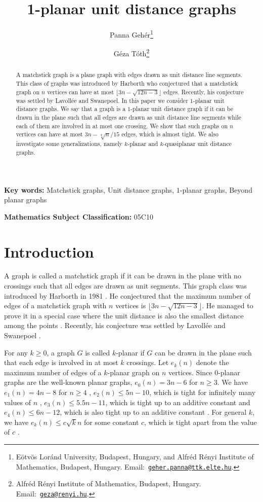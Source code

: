 \documentclass[a4paper,10pt]{article}
\title{1-planar unit distance graphs}
\author{
Panna Geh\'er\thanks{E\"otv\"os Lor\'and University, Budapest, Hungary, and Alfr\'ed R\'enyi Institute of Mathematics, Budapest, Hungary. \newline Email:~\href{mailto:geher.panna@ttk.elte.hu}{\tt geher.panna@ttk.elte.hu}.}
\and
G\'eza T\'oth\thanks{Alfr\'ed R\'enyi Institute of Mathematics, Budapest, Hungary. Email:~\href{mailto:geza@renyi.hu}{\tt geza@renyi.hu}.}
}
\begin{document}
\maketitle


\begin{abstract}
A matchstick graph is a plane graph with edges drawn as unit distance line segments. This class of graphs was introduced by Harborth who conjectured that a matchstick graph on $n$ vertices can have at most $\lfloor 3n - \sqrt{12n - 3}\rfloor$ edges. Recently, his conjecture was settled by Lavoll\'ee and Swanepoel. In this paper we consider $1$-planar unit distance graphs. We say that a graph is a $1$-planar unit distance graph if it can be drawn in the plane such that all edges are drawn as unit distance line segments while each of them are involved in at most one crossing. We show that such graphs on $n$ vertices can have at most $3n-\sqrt[4]{n}/15$ edges, which is almost tight. We also investigate some generalizations, namely $k$-planar and $k$-quasiplanar unit distance graphs.
\end{abstract}

\textbf{Key words:} Matchstick graphs, Unit distance graphs, $1$-planar graphs, Beyond planar graphs

\textbf{Mathematics Subject Classification:} 05C10
\section{Introduction}

\smallskip

A graph is called a matchstick graph if it can be drawn in the plane with no crossings such that all edges are drawn as unit segments. This graph class was introduced by Harborth in 1981 \cite{Harborth1, Harborth2}. He conjectured that the maximum number of edges of a matchstick graph with $n$ vertices is $\lfloor 3n - \sqrt{12n - 3}\rfloor$. He managed to prove it in a special case where the unit distance is also the smallest distance among the points \cite{Harborth74}. Recently, his conjecture was settled by Lavoll\'ee and Swanepoel \cite{LS22}. 


For any $k\ge 0$, a graph $G$ is called $k$-planar if $G$ can be drawn in the plane such that each edge is invol\-ved in at most $k$ crossings. Let $e_k(n)$ denote the maximum number of edges of a $k$-planar graph on $n$ vertices. Since $0$-planar graphs are the well-known planar graphs, $e_0(n)=3n-6$ for $n\ge 3$. We have $e_1(n)=4n-8$ for $n\ge 4$ \cite{PT97}, $e_2(n)\le 5n-10$, which is tight for infinitely many values of $n$  \cite{PT97}, $e_3(n)\le 5.5n-11$, which is tight up to an additive constant  \cite{PRTT06} and $e_4(n)\le 6n-12$, which is also tight up to an additive constant  \cite{A19}. For general $k$, we have $e_k(n)\le c\sqrt{k}n$ for some constant $c$, 
which is tight apart from the value of $c$ \cite{PT97, A19}.
\end{document}
